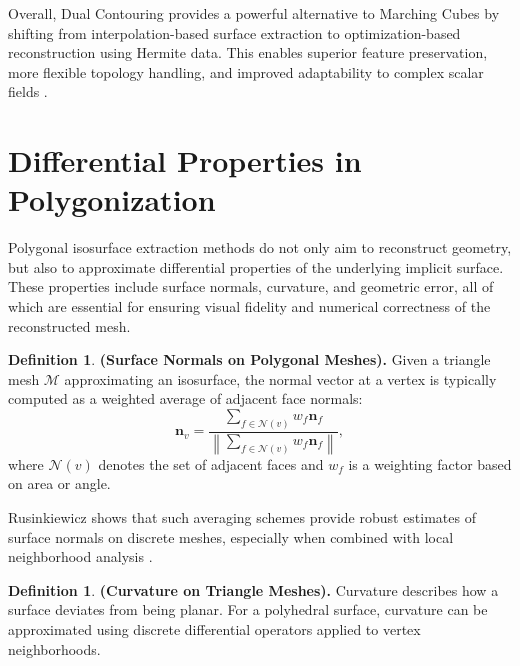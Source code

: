 \documentclass[12pt, a4paper, oneside]{book}
\theoremstyle{plain}
\theoremstyle{definition}
\newtheorem{definition}[theorem]{Definition}
\theoremstyle{remark}
\theoremstyle{definition}
\begin{document}
\vspace{0.5em}

Overall, Dual Contouring provides a powerful alternative to Marching Cubes by shifting from interpolation-based surface extraction to optimization-based reconstruction using Hermite data. This enables superior feature preservation, more flexible topology handling, and improved adaptability to complex scalar fields \cite{ju2002dual,kobbelt2001feature,schaefer2005qef,gao2010adaptive}.


\section{Differential Properties in Polygonization}

Polygonal isosurface extraction methods do not only aim to reconstruct geometry, but also to approximate differential properties of the underlying implicit surface. These properties include surface normals, curvature, and geometric error, all of which are essential for ensuring visual fidelity and numerical correctness of the reconstructed mesh.

\vspace{0.5em}

\begin{definition}
    \textbf{ (Surface Normals on Polygonal Meshes).}
Given a triangle mesh $\mathcal{M}$ approximating an isosurface, the normal vector at a vertex is typically computed as a weighted average of adjacent face normals:
\[
\mathbf{n}_v = \frac{\sum_{f \in \mathcal{N}(v)} w_f \mathbf{n}_f}{\left\|\sum_{f \in \mathcal{N}(v)} w_f \mathbf{n}_f \right\|},
\]
where $\mathcal{N}(v)$ denotes the set of adjacent faces and $w_f$ is a weighting factor based on area or angle.
\end{definition}


Rusinkiewicz shows that such averaging schemes provide robust estimates of surface normals on discrete meshes, especially when combined with local neighborhood analysis \cite{rusinkiewicz2004estimating}.

\vspace{0.5em}

\begin{definition}
    \textbf{ (Curvature on Triangle Meshes).}
Curvature describes how a surface deviates from being planar. For a polyhedral surface, curvature can be approximated using discrete differential operators applied to vertex neighborhoods.

\end{definition}
\end{document}
